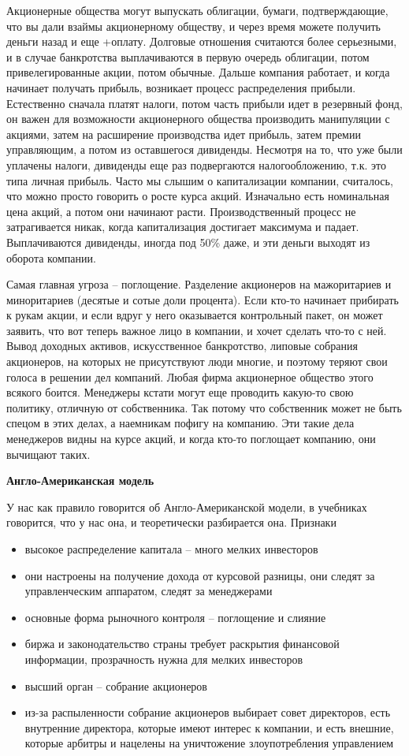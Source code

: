 \documentclass[a4paper, 12pt]{article}
\begin{document}
Акционерные общества могут выпускать облигации, бумаги, подтверждающие, что вы дали взаймы акционерному обществу, и через время можете получить деньги назад и еще +оплату. Долговые отношения считаются более серьезными, и в случае банкротства выплачиваются в первую очередь облигации, потом привелегированные акции, потом обычные. Дальше компания работает, и когда начинает получать прибыль, возникает процесс распределения прибыли. Естественно сначала платят налоги, потом часть прибыли идет в резервный фонд, он важен для возможности акционерного общества производить манипуляции с акциями, затем на расширение производства идет прибыль, затем премии управляющим, а потом из оставшегося дивиденды. Несмотря на то, что уже были уплачены налоги, дивиденды еще раз подвергаются налогообложению, т.к. это типа личная прибыль. Часто мы слышим о капитализации компании, считалось, что можно просто говорить о росте курса акций. Изначально есть номинальная цена акций, а потом они начинают расти. Производственный процесс не затрагивается никак, когда капитализация достигает максимума и падает. Выплачиваются дивиденды, иногда под 50\% даже, и эти деньги выходят из оборота компании. 


Самая главная угроза -- поглощение. Разделение акционеров на мажоритариев и миноритариев (десятые и сотые доли процента). Если кто-то начинает прибирать к рукам акции, и если вдруг у него оказывается контрольный пакет, он может заявить, что вот теперь важное лицо в компании, и хочет сделать что-то с ней. Вывод доходных активов, искусственное банкротство, липовые собрания акционеров, на которых не присутствуют люди многие, и поэтому теряют свои голоса в решении дел компаний. Любая фирма акционерное общество этого всякого боится. Менеджеры кстати могут еще проводить какую-то свою политику, отличную от собственника. Так потому что собственник может не быть спецом в этих делах, а наемникам пофигу на компанию. Эти такие дела менеджеров видны на курсе акций, и когда кто-то поглощает компанию, они вычищают таких. 

\textbf{Англо-Американская модель}

У нас как правило говорится об Англо-Американской модели, в учебниках говорится, что у нас она, и теоретически разбирается она. Признаки 
\begin{itemize}
\item высокое распределение капитала -- много мелких инвесторов
\item они настроены на получение дохода от курсовой разницы, они следят за управленческим аппаратом, следят за менеджерами 
\item основные форма рыночного контроля -- поглощение и слияние 
\item биржа и законодательство страны требует раскрытия финансовой информации, прозрачность нужна для мелких инвесторов 
\item высший орган -- собрание акционеров 
\item из-за распыленности собрание акционеров выбирает совет директоров, есть внутренние директора, которые имеют интерес к компании, и есть внешние, которые арбитры и нацелены на уничтожение злоупотребления управлением 
\end{itemize}
\end{document}
